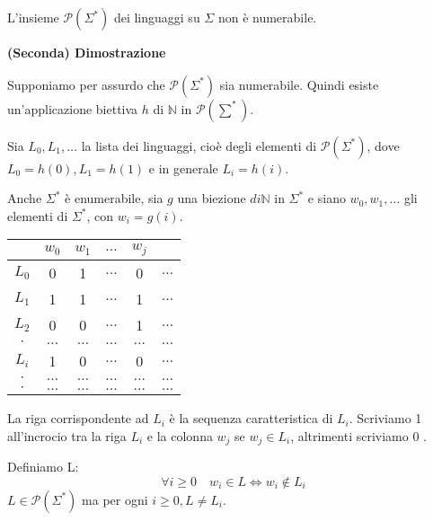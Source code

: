L'insieme $\mathcal{P}\left(\Sigma^{*}\right)$ dei linguaggi su $\Sigma$ non è numerabile.

\vspace{5mm}

\textbf{(Seconda) Dimostrazione}

Supponiamo per assurdo che $\mathcal{P}\left(\Sigma^{*}\right)$ sia numerabile.
Quindi esiste un'applicazione biettiva $h$ di $\mathbb{N}$ in $\mathcal{P}\left(\sum^{*}\right)$.

Sia $L_{0}, L_{1}, \ldots$ la lista dei linguaggi, cioè degli elementi di
$\mathcal{P}\left(\Sigma^{*}\right)$, dove $L_{0}=h(0), L_{1}=h(1)$ e in generale $L_{i}=h(i)$.

Anche $\Sigma^{*}$ è enumerabile, sia $g$ una biezione $d i \mathbb{N}$ in $\Sigma^{*}$ e siano $w_{0}, w_{1}, \ldots$ gli elementi di $\Sigma^{*}$, con $w_{i}=g(i)$.

\vspace{5mm}

\begin{center}
    \begin{tabular}{c|ccccc} 
& $w_{0}$ & $w_{1}$ & $\ldots$ & $w_{j}$ & \\
\hline$L_{0}$ & 0 & 1 & $\ldots$ & 0 & $\ldots$ \\
$L_{1}$ & 1 & 1 & $\ldots$ & 1 & $\ldots$ \\
$L_{2}$ & 0 & 0 & $\ldots$ & 1 & $\ldots$ \\
$\cdot$ & $\ldots$ & $\ldots$ & $\ldots$ & $\ldots$ & $\ldots$ \\
$L_{i}$ & 1 & 0 & $\ldots$ & 0 & $\ldots$ \\
$\cdot$ & $\ldots$ & $\ldots$ & $\ldots$ & $\ldots$ & $\ldots$ \\
$\cdot$ & $\ldots$ & $\ldots$ & $\ldots$ & $\ldots$ & $\ldots$
\end{tabular}

\end{center}

\vspace{5mm}

La riga corrispondente ad $L_{i}$ è la sequenza caratteristica di $L_{i}$. Scriviamo 1 all'incrocio tra la riga $L_{i}$ e la colonna $w_{j}$ se $w_{j} \in L_{i}$, altrimenti scriviamo 0 .

\vspace{5mm}

Definiamo L:
$$
\forall i \geq 0 \quad w_{i} \in L \Leftrightarrow w_{i} \notin L_{i}
$$
$L \in \mathcal{P}\left(\Sigma^{*}\right)$ ma per ogni $i \geq 0, L \neq L_{i} .$

